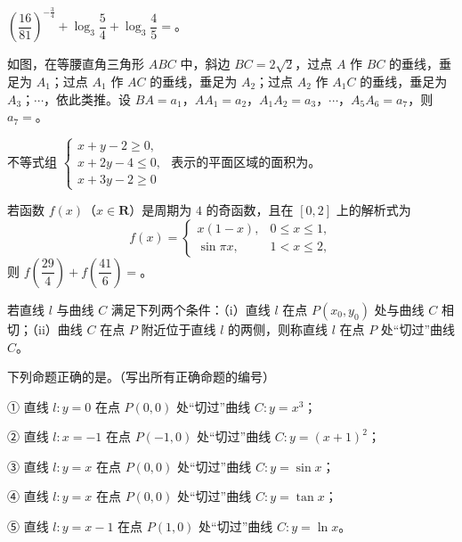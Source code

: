 \begin{question}
$\left(\dfrac{16}{81}\right)^{-\frac34}+\log_3\dfrac54+\log_3\dfrac45=$\gkblank{}。

\Needspace{0.4\textheight}
\end{question}
\begin{question}
如图，在等腰直角三角形 $ABC$ 中，斜边 $BC=2\sqrt2$，过点 $A$ 作 $BC$ 的垂线，垂足为 $A_1$；过点 $A_1$ 作 $AC$ 的垂线，垂足为 $A_2$；过点 $A_2$ 作 $A_1C$ 的垂线，垂足为 $A_3$；$\cdots$，依此类推。设 $BA=a_1$，$AA_1=a_2$，$A_1A_2=a_3$，$\cdots$，$A_5A_6=a_7$，则 $a_7=$\gkblank{}。
\nopagebreak[4]
\begin{center}\end{center}
\nopagebreak[4]
\end{question}
\begin{question}
不等式组 $\begin{cases}x+y-2\geqslant0,\\x+2y-4\leqslant0,\\x+3y-2\geqslant0\end{cases}$ 表示的平面区域的面积为\gkblank{}。

\end{question}
\begin{question}
若函数 $f(x)$（$x\in\mathbf R$）是周期为 $4$ 的奇函数，且在 $[0,2]$ 上的解析式为
\nopagebreak[4]
\[f(x)=\begin{cases}x(1-x),&0\leqslant x\leqslant1,\\\sin\pi x,&1<x\leqslant2,\end{cases}\]
则 $f\left(\dfrac{29}4\right)+f\left(\dfrac{41}6\right)=$\gkblank{}。

\end{question}
\begin{question}
若直线 $l$ 与曲线 $C$ 满足下列两个条件：（i）直线 $l$ 在点 $P(x_0,y_0)$ 处与曲线 $C$ 相切；（ii）曲线 $C$ 在点 $P$ 附近位于直线 $l$ 的两侧，则称直线 $l$ 在点 $P$ 处“切过”曲线 $C$。

下列命题正确的是\gkblank{}。（写出所有正确命题的编号）

① 直线 $l:y=0$ 在点 $P(0,0)$ 处“切过”曲线 $C:y=x^3$；

② 直线 $l:x=-1$ 在点 $P(-1,0)$ 处“切过”曲线 $C:y=(x+1)^2$；

③ 直线 $l:y=x$ 在点 $P(0,0)$ 处“切过”曲线 $C:y=\sin x$；

④ 直线 $l:y=x$ 在点 $P(0,0)$ 处“切过”曲线 $C:y=\tan x$；

⑤ 直线 $l:y=x-1$ 在点 $P(1,0)$ 处“切过”曲线 $C:y=\ln x$。

\end{question}

